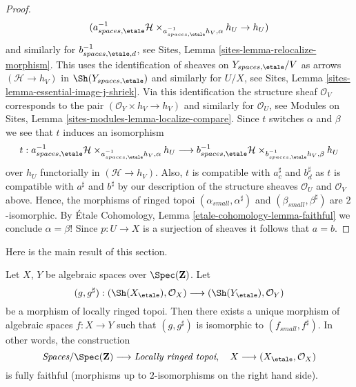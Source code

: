 \begin{proof}
$$(a_{spaces, \etale}^{-1}\mathcal{H}
\times_{a_{spaces, \etale}^{-1}h_V, \alpha}
h_U \to
h_U)
$$
and similarly for $b_{spaces, \etale, d}^{-1}$, see
Sites, Lemma \ref{sites-lemma-relocalize-morphism}.
This uses the identification of sheaves on $Y_{spaces, \etale}/V$
as arrows $(\mathcal{H} \to h_V)$ in $\Sh(Y_{spaces, \etale})$
and similarly for $U/X$, see
Sites, Lemma \ref{sites-lemma-essential-image-j-shriek}.
Via this identification the structure sheaf $\mathcal{O}_V$ corresponds to the
pair $(\mathcal{O}_Y \times h_V \to h_V)$ and similarly
for $\mathcal{O}_U$, see
Modules on Sites,
Lemma \ref{sites-modules-lemma-localize-compare}.
Since $t$ switches $\alpha$ and $\beta$ we see that $t$ induces an isomorphism
$$
t :
a_{spaces, \etale}^{-1}\mathcal{H}
\times_{a_{spaces, \etale}^{-1}h_V, \alpha}
h_U
\longrightarrow
b_{spaces, \etale}^{-1}\mathcal{H}
\times_{b_{spaces, \etale}^{-1}h_V, \beta}
h_U
$$
over $h_U$ functorially in $(\mathcal{H} \to h_V)$. Also, $t$ is compatible
with $a_c^\sharp$ and $b_d^\sharp$ as $t$ is
compatible with $a^\sharp$ and $b^\sharp$ by our description
of the structure sheaves $\mathcal{O}_U$ and $\mathcal{O}_V$
above. Hence, the morphisms of ringed topoi
$(\alpha_{small}, \alpha^\sharp)$ and $(\beta_{small}, \beta^\sharp)$
are $2$-isomorphic. By
\'Etale Cohomology, Lemma \ref{etale-cohomology-lemma-faithful}
we conclude $\alpha = \beta$! Since $p : U \to X$ is a surjection
of sheaves it follows that $a = b$.
\end{proof}

\noindent
Here is the main result of this section.

\begin{theorem}
\label{theorem-fully-faithful}
Let $X$, $Y$ be algebraic spaces over $\Spec(\mathbf{Z})$.
Let
$$
(g, g^\sharp) :
(\Sh(X_\etale), \mathcal{O}_X)
\longrightarrow
(\Sh(Y_\etale), \mathcal{O}_Y)
$$
be a morphism of locally ringed topoi. Then there exists a
unique morphism of algebraic spaces $f : X \to Y$ such that
$(g, g^\sharp)$ is isomorphic to $(f_{small}, f^\sharp)$.
In other words, the construction
$$
\textit{Spaces}/\Spec(\mathbf{Z})
\longrightarrow \textit{Locally ringed topoi},
\quad
X \longrightarrow (X_\etale, \mathcal{O}_X)
$$
is fully faithful (morphisms up to $2$-isomorphisms on the right hand side).
\end{theorem}

